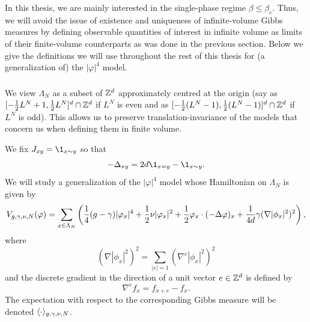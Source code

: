 In this thesis, we are mainly interested in the single-phase regime $\beta\le\beta_c$.
Thus, we will avoid the issue of
existence and uniqueness of infinite-volume Gibbs measures by defining observable
quantities of interest in infinite volume as limits
of their finite-volume counterparts as was done in the previous section.
Below we give the definitions we will use throughout the rest of this thesis for
(a generalization of) the $|\varphi|^4$ model.


\subsubsection{}

We view $\Lambda_N$ as a subset of ${ {{\mathbb Z}}^d }$ approximately centred at the origin (say as
$[-\frac12 L^N+1,\frac12 L^N]^d \cap {\mathbb Z}^d$ if $L^N$ is even
and as $[-\frac12 (L^N-1), \frac12 (L^N-1)]^d \cap {\mathbb Z}^d$ if $L^N$ is odd). This allows us to preserve
translation-invariance of the models that concern us when defining them in finite volume.

We fix $J_{xy} = \1_{x\sim y}$ so that
\begin{equation}
-\Delta_{xy} = 2 d \1_{x = y} - \1_{x\sim y}.
\end{equation}
We will study a generalization of the $|\varphi|^4$ model whose Hamiltonian
on $\Lambda_N$ is given by
\begin{equation}
\label{e:Vdef1}
V_{g,\gamma,\nu,N}(\varphi)
	=
\sum_{x\in\Lambda_N}
\left(
	\frac{1}{4} (g - \gamma) |\varphi_x|^4
		+
	\frac{1}{2} \nu |\varphi_x|^2
		+
	\frac{1}{2} \varphi_x \cdot (-\Delta \varphi)_x
		+
	\frac{1}{4 d} \gamma (\nabla |\phi_x|^2)^2
\right),
\end{equation}
where
\begin{equation}
(\nabla |\phi_x|^2)^2
	=
\sum_{|e|=1} (\nabla^e |\phi_x|^2)^2
\end{equation}
and the discrete gradient in the direction of a unit vector $e\in{ {{\mathbb Z}}^d }$ is defined by
\begin{equation}
\nabla^e f_x = f_{x+e} - f_x.
\end{equation}
The expectation with respect to the corresponding Gibbs measure will
be denoted $\langle\cdot\rangle_{g,\gamma,\nu,N}$.

